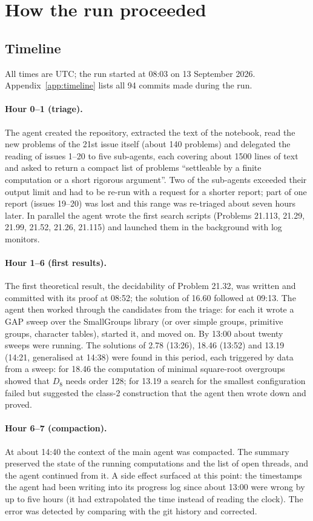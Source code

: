 \section{How the run proceeded}\label{sec:process}

\subsection{Timeline}
All times are UTC; the run started at 08:03 on 13 September 2026. Appendix~\ref{app:timeline} lists all 94 commits made during the run.

\paragraph{Hour 0--1 (triage).} The agent created the repository, extracted the text of the notebook, read the
new problems of the 21st issue itself (about 140 problems) and delegated the reading of issues 1--20 to five
sub-agents, each covering about 1500 lines of text and asked to return a compact list of problems ``settleable by
a finite computation or a short rigorous argument''. Two of the sub-agents exceeded their output limit and had to
be re-run with a request for a shorter report; part of one report (issues 19--20) was lost and this range was
re-triaged about seven hours later. In parallel the agent wrote the first search scripts (Problems 21.113, 21.29, 21.99,
21.52, 21.26, 21.115) and launched them in the background with log monitors.

\paragraph{Hour 1--6 (first results).} The first theoretical result, the decidability of Problem 21.32, was written and committed with its proof at 08:52;
the solution of 16.60 followed at 09:13. The agent then worked through the
candidates from the triage: for each it wrote a GAP sweep over the SmallGroups library (or over simple groups,
primitive groups, character tables), started it, and moved on. By 13:00 about twenty sweeps were running. The
solutions of 2.78 (13:26), 18.46 (13:52) and 13.19 (14:21, generalised at 14:38) were found in this period, each
triggered by data from a sweep: for 18.46 the computation of minimal square-root overgroups showed that $D_8$
needs order 128; for 13.19 a search for the smallest configuration failed but suggested the class-2 construction
that the agent then wrote down and proved.

\paragraph{Hour 6--7 (compaction).} At about 14:40 the context of the main agent was compacted. The summary
preserved the state of the running computations and the list of open threads, and the agent continued from it. A
side effect surfaced at this point: the timestamps the agent had been writing into its progress log since about
13:00 were wrong by up to five hours (it had extrapolated the time instead of reading the clock). The error was
detected by comparing with the git history and corrected.

